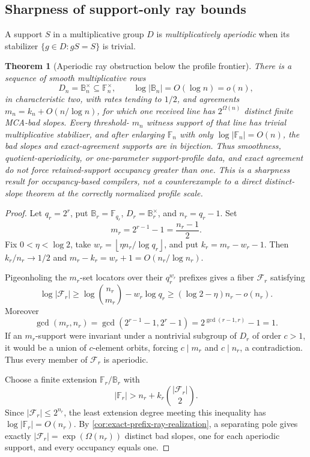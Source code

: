 \documentclass[11pt,a4paper]{amsart}
\numberwithin{equation}{section}
\newtheorem{theorem}{Theorem}[section]
\theoremstyle{remark}
\newcommand{\F}{\mathbb F}
\newcommand{\B}{\mathbb B}
\newcommand{\Fcal}{\mathcal F}
\newcommand{\abs}[1]{\lvert #1\rvert}
\newcommand{\floor}[1]{\left\lfloor #1\right\rfloor}
\begin{document}
\subsection{Sharpness of support-only ray bounds}
A support \(S\) in a multiplicative group \(D\) is
\emph{multiplicatively aperiodic} when its stabilizer
\(\{g\in D:gS=S\}\) is trivial.
\begin{theorem}[Aperiodic ray obstruction below the profile frontier]
\label{thm:aperiodic-ray-obstruction}
There is a sequence of smooth multiplicative rows
\[
 D_n=\B_n^\times\subseteq\F_n^\times,
 \qquad \log\abs{\B_n}=O(\log n)=o(n),
\]
in characteristic two, with rates tending to \(1/2\), and agreements
\(m_n=k_n+O(n/\log n)\), for which one received line has
\(2^{\Omega(n)}\) distinct finite MCA-bad slopes.  Every threshold-
\(m_n\) witness support of that line has trivial multiplicative
stabilizer, and after enlarging \(\F_n\) with only
\(\log\abs{\F_n}=O(n)\), the bad slopes and exact-agreement supports are
in bijection.  Thus smoothness, quotient-aperiodicity, or one-parameter
support-profile data,
and exact agreement do not force retained-support occupancy greater than
one.  This is a sharpness result for occupancy-based compilers, not a
counterexample to a direct distinct-slope theorem at the correctly
normalized profile scale.
\end{theorem}

\begin{proof}
Let \(q_r=2^r\), put \(\B_r=\F_{q_r}\),
\(D_r=\B_r^\times\), and \(n_r=q_r-1\).  Set
\[
 m_r=2^{r-1}-1=\frac{n_r-1}{2}.
\]
Fix \(0<\eta<\log2\), take
\(w_r=\floor{\eta n_r/\log q_r}\), and put
\(k_r=m_r-w_r-1\).  Then \(k_r/n_r\to1/2\) and
\(m_r-k_r=w_r+1=O(n_r/\log n_r)\).

Pigeonholing the \(m_r\)-set locators over their \(q_r^{w_r}\) prefixes
gives a fiber \(\Fcal_r\) satisfying
\[
 \log\abs{\Fcal_r}
 \ge \log\binom{n_r}{m_r}-w_r\log q_r
 \ge(\log2-\eta)n_r-o(n_r).
\]
Moreover
\[
 \gcd(m_r,n_r)=
 \gcd(2^{r-1}-1,2^r-1)=2^{\gcd(r-1,r)}-1=1.
\]
If an \(m_r\)-support were invariant under a nontrivial subgroup of
\(D_r\) of order \(c>1\), it would be a union of \(c\)-element orbits,
forcing \(c\mid m_r\) and \(c\mid n_r\), a contradiction.  Thus every
member of \(\Fcal_r\) is aperiodic.

Choose a finite extension \(\F_r/\B_r\) with
\[
 \abs{\F_r}>n_r+k_r\binom{\abs{\Fcal_r}}2.
\]
Since \(\abs{\Fcal_r}\le2^{n_r}\), the least extension degree meeting
this inequality has \(\log\abs{\F_r}=O(n_r)\).  By
\cref{cor:exact-prefix-ray-realization}, a separating pole gives exactly
\(\abs{\Fcal_r}=\exp(\Omega(n_r))\) distinct bad slopes, one for each
aperiodic support, and every occupancy equals one.
\end{proof}
\end{document}
